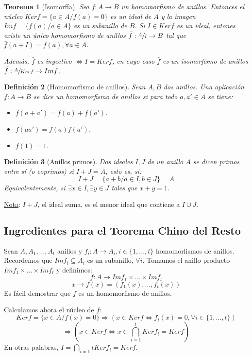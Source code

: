 \documentclass[11pt,a4paper]{article}
\theoremstyle{break}
\newtheorem{theorem}{Teorema}[section]
\newtheorem{definition}[theorem]{Definición}
\begin{document}
\begin{theorem}[Isomorfía]
Sea $f: A \to B$ un homomorfismo de anillos. Entonces el núcleo $Ker f = \{a \in A / f(a) = 0\}$ es un ideal de $A$ y la imagen $Im f = \{f(a) / a \in A\}$ es un subanillo de $B$. Si $I \in Ker f$ es un ideal, entones existe un único homomorfismo de anillos $\bar{f}: \sfrac{A}{I} \to B$ tal que $\bar{f}(a + I) = f(a), \forall a \in A$.

Además, $\bar{f}$ es inyectivo $\iff I  = Ker f$, en cuyo caso $\bar{f}$ es un isomorfismo de anillos $\bar{f}: \sfrac{A}{Ker f} \to Im f$.
\end{theorem}

\begin{definition}[Homomorfismo de anillos]
Sean $A, B$ dos anillos. Una aplicación $f: A \to B$ se dice un homomorfismo de anillos si para todo $a, a' \in A$ se tiene:
\begin{itemize}
\item $f(a + a') = f(a) + f(a')$.
\item $f(aa') = f(a) f(a')$.
\item $f(1) = 1$.
\end{itemize}
\end{definition}

\begin{definition}[Anillos primos]
Dos ideales $I, J$ de un anillo $A$ se dicen primos entre sí (o coprimos) si $I + J = A$, esto es, si:
$$I + J = \{a + b / a \in I, b \in J\} = A$$
Equivalentemente, si $\exists x \in I, \exists y \in J$ tales que $x + y = 1$.
\end{definition}

\underline{Nota}: $I + J$, el ideal suma, es el menor ideal que contiene a $I \cup J$.

\subsection*{Ingredientes para el Teorema Chino del Resto}
Sean $A, A_{1}, ..., A_{t}$ anillos y $f_{i}: A \to A_{i}, i \in \{1, ..., t\}$ homomorfismos de anillos. Recordemos que $Im f_{i} \subseteq A_{i}$ es un subanillo, $\forall i$. Tomamos el anillo producto $Im f_{1} \times ... \times Im f_{t}$ y definimos:
$$f: A \to Im f_{1} \times ... \times Im f_{t}$$
$$x \mapsto f(x) = (f_{1}(x), ..., f_{t}(x))$$
Es fácil demostrar que $f$ es un homomorfismo de anillos.

Calculamos ahora el núcleo de $f$:
$$Ker f = \{x \in A / f(x) = 0\} \Rightarrow (x \in Ker f \iff f_{i}(x) = 0, \forall i \in \{1, ..., t\})$$
$$\Rightarrow (x \in Ker f \iff x \in \bigcap_{i=1}^{t} Ker f_{i} = Ker f)$$
En otras palabras, $I = \bigcap_{i=1}{t} Ker f_{i} = Ker f$.
\end{document}

